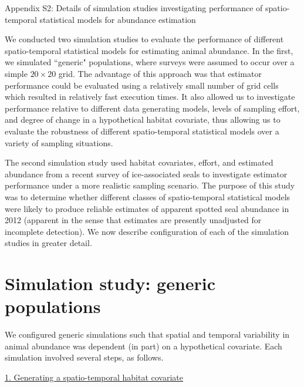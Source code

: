 \documentclass[12pt,fleqn]{article}
\begin{document}
\rm \begin{flushleft}

\raggedbottom
\vspace{.5in}


\begin{center}
Appendix S2: Details of simulation studies investigating performance of spatio-temporal statistical models for abundance estimation
\bigskip
\end{center}

\doublespacing
We conducted two simulation studies to evaluate the performance of different spatio-temporal statistical models for estimating animal abundance.  In the first, we simulated ``generic" populations, where surveys were assumed to occur over a simple $20 \times 20$ grid.  The advantage of this approach was that estimator performance could be evaluated using a relatively small number of grid cells which resulted in relatively fast execution times.  It also allowed us to investigate performance relative to different data generating models, levels of sampling effort, and degree of change in a hypothetical habitat covariate, thus allowing us to evaluate the robustness of different spatio-temporal statistical models over a variety of sampling situations.

\hspace{.5in} The second simulation study used habitat covariates, effort, and estimated abundance from a recent survey of ice-associated seals \citep[see e.g.][]{ConnEtAl2014} to investigate estimator performance under a more realistic sampling scenario.  The purpose of this study was to determine whether different classes of spatio-temporal statistical models were likely to produce reliable estimates of apparent spotted seal abundance in 2012 (apparent in the sense that estimates are presently unadjusted for incomplete detection).  We now describe configuration of each of the simulation studies in greater detail.

\section{Simulation study: generic populations}

We configured generic simulations such that spatial and temporal variability in animal abundance was dependent (in part) on a hypothetical covariate.  Each simulation involved several steps, as follows.

\underline{1. Generating a spatio-temporal habitat covariate}


\end{flushleft}
\end{document}
